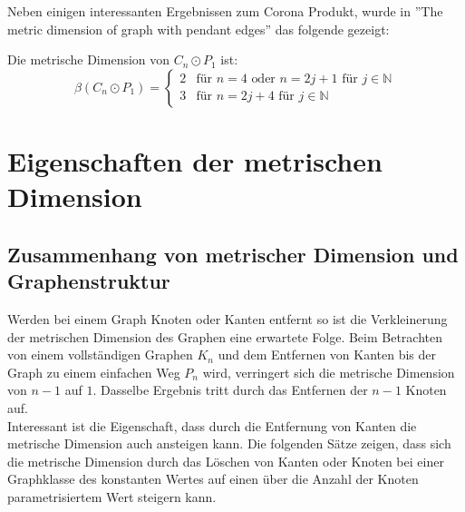 Neben einigen interessanten Ergebnissen zum Corona Produkt, wurde in  ''The metric dimension
of graph with pendant edges''\cite{sun} das folgende gezeigt:
\begin{lem}Die metrische Dimension von $C_n \odot P_1$ ist:
\begin{equation}
  \beta(C_n \odot P_1)=
   \begin{cases}
     2 & \text{f\"ur } n = 4 \text{ oder } n = 2j+1 \text{ f\"ur } j \in \mathbb{N} \\
     3 & \text{f\"ur } n = 2j+4 \text{ f\"ur } j \in \mathbb{N} 
   \end{cases}
\end{equation}
\end{lem}
\chapter{Eigenschaften der metrischen Dimension}
\label{kapallg}
\section{Zusammenhang von metrischer Dimension und Graphenstruktur}
Werden bei einem Graph Knoten oder Kanten entfernt so ist die Verkleinerung der metrischen Dimension des Graphen eine erwartete Folge. Beim Betrachten von einem vollständigen Graphen $K_n$ und dem Entfernen von Kanten bis der Graph zu einem einfachen Weg $P_n$ wird, verringert sich die metrische Dimension von $n-1$ auf $1$. Dasselbe Ergebnis tritt durch das Entfernen der $n-1$ Knoten auf.\\Interessant ist die Eigenschaft, dass durch die Entfernung von Kanten die metrische Dimension auch ansteigen kann. Die folgenden Sätze zeigen, dass sich die metrische Dimension durch das Löschen von Kanten oder Knoten bei einer Graphklasse des konstanten Wertes auf einen über die Anzahl der Knoten parametrisiertem Wert steigern kann.
